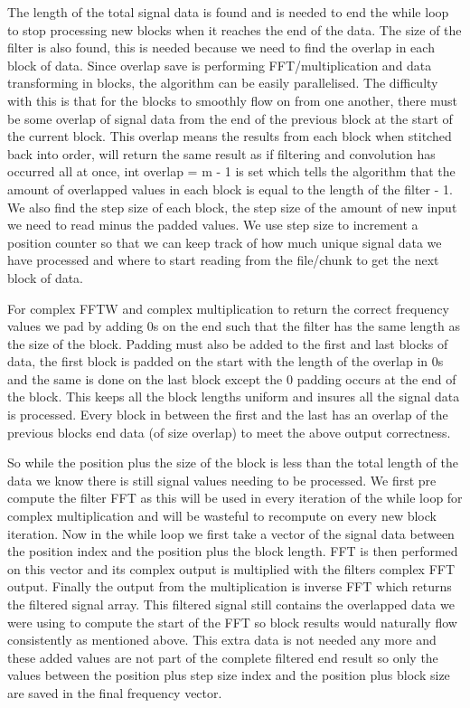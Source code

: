 \documentclass{article}
\begin{document}
The length of the total signal data is found and is needed to end the while loop to stop processing new blocks when it reaches the end of the data. The size of the filter is also found, this is needed because we need to find the overlap in each block of data. Since overlap save is performing FFT/multiplication and data transforming in blocks, the algorithm can be easily parallelised. The difficulty with this is that for the blocks to smoothly flow on from one another, there must be some overlap of signal data from the end of the previous block at the start of the current block. This overlap means the results from each block when stitched back into order, will return the same result as if filtering and convolution has occurred all at once, int overlap = m - 1 is set which tells the algorithm that the amount of overlapped values in each block is equal to the length of the filter - 1. We also find the step size of each block, the step size of the amount of new input we need to read minus the padded values. We use step size to increment a position counter so that we can keep track of how much unique signal data we have processed and where to start reading from the file/chunk to get the next block of data.

For complex FFTW and complex multiplication to return the correct frequency values we pad by adding 0s on the end such that the filter has the same length as the size of the block. Padding must also be added to the first and last blocks of data, the first block is padded on the start with the length of the overlap in 0s and the same is done on the last block except the 0 padding occurs at the end of the block. This keeps all the block lengths uniform and insures all the signal data is processed. Every block in between the first and the last has an overlap of the previous blocks end data (of size overlap) to meet the above output correctness.

So while the position plus the size of the block is less than the total length of the data we know there is still signal values needing to be processed. We first pre compute the filter FFT as this will be used in every iteration of the while loop for complex multiplication and will be wasteful to recompute on every new block iteration. Now in the while loop we first take a vector of the signal data between the position index and the position plus the block length. FFT is then performed on this vector and its complex output is multiplied with the filters complex FFT output. Finally the output from the multiplication is inverse FFT which returns the filtered signal array. This filtered signal still contains the overlapped data we were using to compute the start of the FFT so block results would naturally flow consistently as mentioned above. This extra data is not needed any more and these added values are not part of the complete filtered end result so only the values between the position plus step size index and the position plus block size are saved in the final frequency vector.
\end{document}
